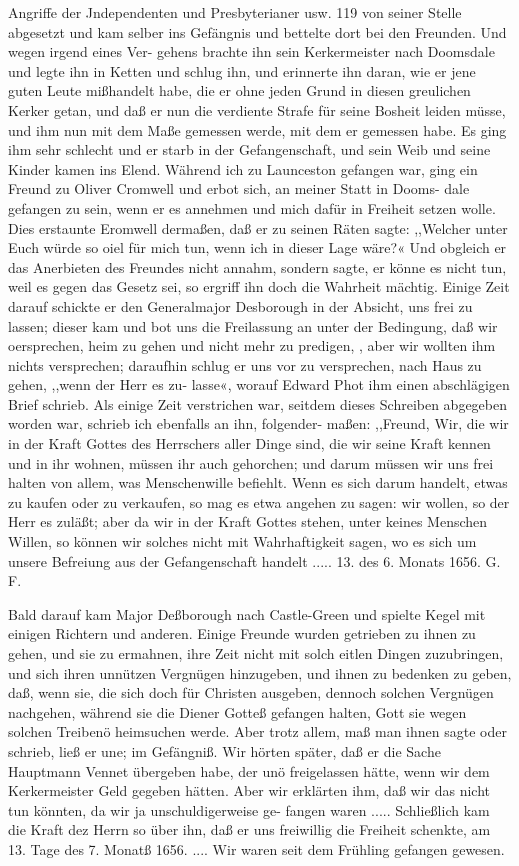 Angriffe der Jndependenten und Presbyterianer usw. 119
von seiner Stelle abgesetzt und kam selber ins Gefängnis und
bettelte dort bei den Freunden. Und wegen irgend eines Ver-
gehens brachte ihn sein Kerkermeister nach Doomsdale und legte
ihn in Ketten und schlug ihn, und erinnerte ihn daran, wie er
jene guten Leute mißhandelt habe, die er ohne jeden Grund in
diesen greulichen Kerker getan, und daß er nun die verdiente
Strafe für seine Bosheit leiden müsse, und ihm nun mit dem
Maße gemessen werde, mit dem er gemessen habe. Es ging ihm
sehr schlecht und er starb in der Gefangenschaft, und sein Weib
und seine Kinder kamen ins Elend.
Während ich zu Launceston gefangen war, ging ein Freund
zu Oliver Cromwell und erbot sich, an meiner Statt in Dooms-
dale gefangen zu sein, wenn er es annehmen und mich dafür
in Freiheit setzen wolle. Dies erstaunte Eromwell dermaßen,
daß er zu seinen Räten sagte: ,,Welcher unter Euch würde so oiel
für mich tun, wenn ich in dieser Lage wäre?« Und obgleich er
das Anerbieten des Freundes nicht annahm, sondern sagte, er
könne es nicht tun, weil es gegen das Gesetz sei, so ergriff ihn
doch die Wahrheit mächtig. Einige Zeit darauf schickte er den
Generalmajor Desborough in der Absicht, uns frei zu lassen;
dieser kam und bot uns die Freilassung an unter der Bedingung,
daß wir oersprechen, heim zu gehen und nicht mehr zu predigen,
, aber wir wollten ihm nichts versprechen; daraufhin schlug er uns
vor zu versprechen, nach Haus zu gehen, ,,wenn der Herr es zu-
lasse«, worauf Edward Phot ihm einen abschlägigen Brief schrieb.
Als einige Zeit verstrichen war, seitdem dieses Schreiben
abgegeben worden war, schrieb ich ebenfalls an ihn, folgender-
maßen:
,,Freund,
Wir, die wir in der Kraft Gottes des Herrschers aller Dinge
sind, die wir seine Kraft kennen und in ihr wohnen, müssen ihr
auch gehorchen; und darum müssen wir uns frei halten von
allem, was Menschenwille befiehlt. Wenn es sich darum handelt,
etwas zu kaufen oder zu verkaufen, so mag es etwa angehen zu
sagen: wir wollen, so der Herr es zuläßt; aber da wir in der
Kraft Gottes stehen, unter keines Menschen Willen, so können wir
solches nicht mit Wahrhaftigkeit sagen, wo es sich um unsere
Befreiung aus der Gefangenschaft handelt .....
13. des 6. Monats 1656. G. F.

Bald darauf kam Major Deßborough nach Castle-Green und
spielte Kegel mit einigen Richtern und anderen. Einige Freunde
wurden getrieben zu ihnen zu gehen, und sie zu ermahnen, ihre
Zeit nicht mit solch eitlen Dingen zuzubringen, und sich ihren
unnützen Vergnügen hinzugeben, und ihnen zu bedenken zu geben,
daß, wenn sie, die sich doch für Christen ausgeben, dennoch solchen
Vergnügen nachgehen, während sie die Diener Gotteß gefangen
halten, Gott sie wegen solchen Treibenö heimsuchen werde. Aber
trotz allem, maß man ihnen sagte oder schrieb, ließ er une; im
Gefängniß. Wir hörten später, daß er die Sache Hauptmann
Vennet übergeben habe, der unö freigelassen hätte, wenn wir
dem Kerkermeister Geld gegeben hätten. Aber wir erklärten ihm,
daß wir das nicht tun könnten, da wir ja unschuldigerweise ge-
fangen waren ..... Schließlich kam die Kraft dez Herrn so
über ihn, daß er uns freiwillig die Freiheit schenkte, am 13. Tage
des 7. Monatß 1656. .... Wir waren seit dem Frühling
gefangen gewesen.